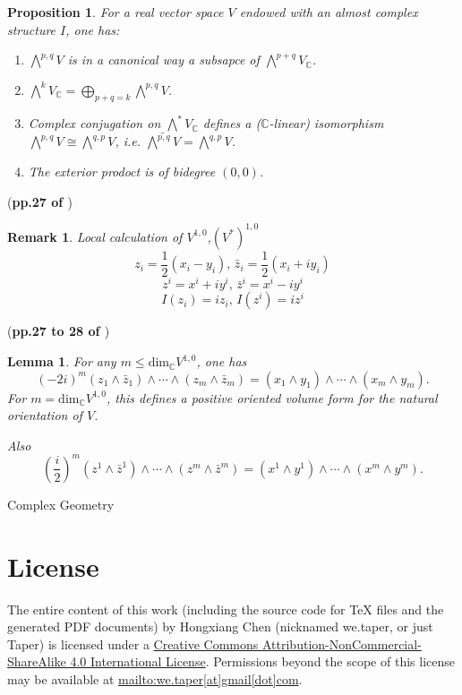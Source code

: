 \documentclass{book}
\numberwithin{equation}{subsection} %
\newtheorem{lemma}{Lemma}[section]
\newtheorem{remark}{Remark}[section]
\newtheorem{prop}{Proposition}[section]
\theoremstyle{definition}
\begin{document}
\begin{prop}
    For a real vector space $V$ endowed with an almost complex
    structure $I$, one has:
    \begin{enumerate}
        \item $\bigwedge^{p,q}V$ is in a canonical way a subsapce
            of $\bigwedge^{p+q} V_{\mathbb{C}}$.
        \item $\bigwedge^k V_{\mathbb{C}}
            = \bigoplus_{p+q=k}\bigwedge^{p,q}V$.
        \item Complex conjugation on $\bigwedge^* V_{\mathbb{C}}$ defines
            a ($\mathbb{C}$-linear) isomorphism
            $\bigwedge^{p,q}V\cong \bigwedge^{q,p}V$, i.e.
            $\bar{\bigwedge^{p,q}V}=\bigwedge^{q,p}V$.
        \item The exterior prodoct is of bidegree $(0,0)$.
    \end{enumerate}
\end{prop}
(\textbf{pp.27 of \cite{book}})
\begin{remark}{Local calculation of $V^{1,0}$,$(V^*)^{1,0}$}
    $$z_i=\frac{1}{2}(x_i-y_i)\text{, }\bar{z}_i=\frac{1}{2}(x_i+iy_i)$$
    $$z^i=x^i+iy^i\text{, }\bar{z}^i=x^i-iy^i$$
    $$I(z_i)=i z_i\text{, }I(z^i)=i z^i$$
\end{remark}
(\textbf{pp.27 to 28 of \cite{book}})

\begin{lemma}
    For any $m\leq \text{dim}_{\mathbb{C}}V^{1,0}$, one has
    $$(-2i)^m (z_1\wedge\bar{z}_1)\wedge\cdots\wedge(z_m\wedge\bar{z}_m)=
        (x_1\wedge y_1)\wedge\cdots\wedge(x_m\wedge y_m).$$
    For $m=\text{dim}_\mathbb{C} V^{1,0}$, this defines a positive
    oriented volume form for the natural orientation of $V$.

    Also
    $$\left(\frac{i}{2}\right)^m
      (z^1\wedge\bar{z}^1)\wedge\cdots\wedge(z^m\wedge\bar{z}^m)=
      (x^1\wedge y^1)\wedge\cdots\wedge(x^m\wedge y^m).$$
\end{lemma}

\begin{thebibliography}{1}
	 Complex Geometry
\end{thebibliography}
\part{License}
The entire content of this work (including the source code
for TeX files and the generated PDF documents) by 
Hongxiang Chen (nicknamed we.taper, or just Taper) is
licensed under a 
\href{http://creativecommons.org/licenses/by-nc-sa/4.0/}{Creative 
Commons Attribution-NonCommercial-ShareAlike 4.0 International 
License}. Permissions beyond the scope of this 
license may be available at \url{mailto:we.taper[at]gmail[dot]com}.
\end{document}

